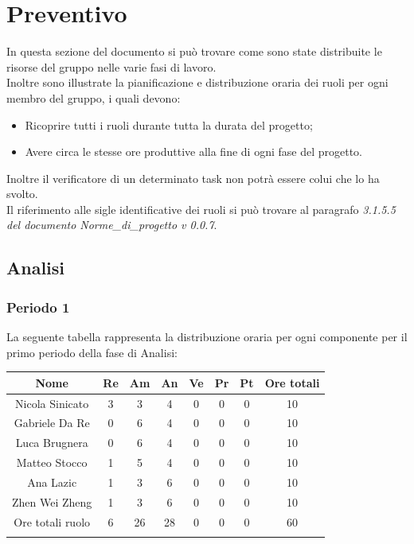 \section{Preventivo}
In questa sezione del documento si può trovare come sono state distribuite le risorse del gruppo nelle varie fasi di lavoro.\\
Inoltre sono illustrate la pianificazione e distribuzione oraria dei ruoli per ogni membro del gruppo, i quali devono:
\begin{itemize}
	\item Ricoprire tutti i ruoli durante tutta la durata del progetto;
	\item Avere circa le stesse ore produttive alla fine di ogni fase del progetto.
\end{itemize}
Inoltre il verificatore di un determinato task non potrà essere colui che lo ha svolto.\\
Il riferimento alle sigle identificative dei ruoli si può trovare al paragrafo \textit{3.1.5.5 del documento Norme\_di\_progetto v 0.0.7}.
\newpage
\subsection{Analisi}
%
\subsubsection{Periodo 1}
%
La seguente tabella rappresenta la distribuzione oraria per ogni componente per il primo periodo della fase di Analisi:

	\setlength\extrarowheight{5pt}
	\begin{tabularx}{\textwidth}{|ccccccc|c|}
		\hline
		\rowcolor{white}
		\textbf{Nome} & \textbf{Re} & \textbf{Am} & \textbf{An} & \textbf{Ve} & \textbf{Pr}& \textbf{Pt} & \textbf{Ore totali} \\
		\hline
		Nicola Sinicato &3&3&4&0&0&0&10 \\
		Gabriele Da Re &0&6&4&0&0&0&10 \\
		Luca Brugnera &0&6&4&0&0&0&10 \\
		Matteo Stocco &1&5&4&0&0&0&10 \\
		Ana Lazic &1&3&6&0&0&0&10 \\
		Zhen Wei Zheng &1&3&6&0&0&0&10 \\
		\hline
		Ore totali ruolo &6&26&28&0&0&0&60 \\
		\hline
		\rowcolor{white}
		\caption{ Distribuzione oraria durante il primo periodo di analisi per ruolo e persona}
	\end{tabularx}
	\vspace{10pt}
	

